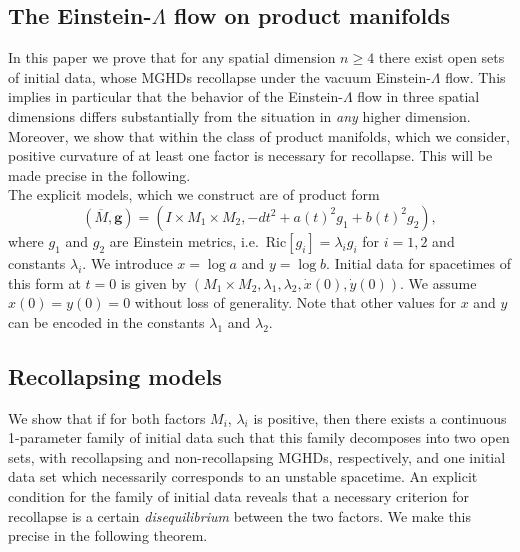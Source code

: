 \documentclass[a4paper,10pt]{article}
\theoremstyle{plain}
\theoremstyle{definition}
\theoremstyle{remark}
\theoremstyle{plain}
\newcommand{\eq}[1]{\begin{equation}#1\end{equation}}
\newcommand{\la}{\lambda}
\newcommand{\La}{\Lambda}
\numberwithin{equation}{section}
\begin{document}
\subsection{The Einstein-$\La$ flow on product manifolds}
In this paper we prove that for any spatial dimension $n\geq 4$ there exist open sets of initial data, whose MGHDs recollapse under the vacuum Einstein-$\La$ flow. This implies in particular that the behavior of the Einstein-$\La$ flow in three spatial dimensions differs substantially from the situation in \emph{any} higher dimension. Moreover, we show that within the class of product manifolds, which we consider, positive curvature of at least one factor is necessary for recollapse. This will be made precise in the following.\\


\noindent The explicit models, which we construct are of product form
\eq{\label{ansatz}
\left(\overline M,\mathbf g\right)=\left(I\times M_1\times M_2,-dt^2+a(t)^2 g_1+b(t)^2g_2\right),
}
where $g_1$ and $g_2$ are Einstein metrics, i.e.~$\mathrm {Ric}[g_i]=\la_i g_i$ for $i=1,2$ and constants $\la_i$. We introduce $x=\log a$ and $y=\log b$. Initial data for spacetimes of this form at $t=0$ is given by $(M_1\times M_2,\la_1,\la_2,\dot x(0),\dot y (0))$. We assume $x(0)=y(0)=0$ without loss of generality. Note that other values for $x$ and $y$ can be encoded in the constants $\la_1$ and $\la_2$.
\subsection{Recollapsing models}
We show that if for both factors $M_i$, $\la_i$ is positive, then there exists a continuous 1-parameter family of initial data such that this family decomposes into two open sets, with recollapsing and non-recollapsing MGHDs, respectively, and one initial data set which necessarily corresponds to an unstable spacetime. An explicit condition for the family of initial data reveals that a necessary criterion for recollapse is a certain \emph{disequilibrium} between the two factors. We make this precise in the following theorem.
\end{document}
